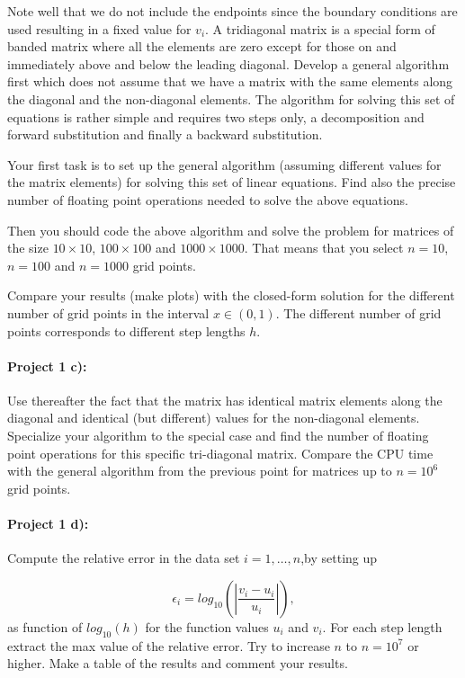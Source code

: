 \documentclass[%
oneside,                 %
final,                   %
10pt]{article}
\begin{document}
Note well that we do not include the endpoints since the boundary conditions are used resulting in a fixed value for $v_i$.
A tridiagonal matrix is a special form of banded matrix where all the elements are zero except for 
those on and immediately above and below the leading diagonal.
Develop a general algorithm first which does not assume that we have a matrix with the same elements along the diagonal and the non-diagonal elements.
The algorithm for solving this set of equations is rather simple and requires two steps only, a decomposition 
and forward substitution and finally a backward substitution. 


Your first task is to set up the general algorithm (assuming different values for the matrix elements) for solving this set of linear equations.
Find also the precise number of floating point 
operations needed to solve the above equations. 


Then you should code the above algorithm and solve the problem for matrices of the size
$10\times 10$, $100\times 100$ and $1000\times 1000$.  That means that you select $n=10$, $n=100$ and
$n=1000$ grid points. 

Compare your results (make plots) with the closed-form solution for the different number of grid points  in the 
interval $x\in(0,1)$.  The different number of grid points corresponds to different step lengths $h$.

\paragraph{Project 1 c):}
Use thereafter the fact that the matrix has identical matrix elements along the diagonal and identical (but different) values for the non-diagonal elements. Specialize your algorithm to the special case and find the number of floating point operations
for this specific tri-diagonal matrix. Compare the CPU time with the general algorithm from the previous point for matrices up to  $n=10^6$ grid points. 

\paragraph{Project 1 d):}
Compute the relative error  in the data set $i=1,\dots, n$,by setting up

\[
   \epsilon_i=log_{10}\left(\left|\frac{v_i-u_i}
                 {u_i}\right|\right),
\]
as function of $log_{10}(h)$ for the function values $u_i$ and $v_i$.
For each step length extract the max value of the relative error.  
Try to increase $n$ to $n=10^7$ or higher.  Make a table of the results and 
comment your results. 
\end{document}
